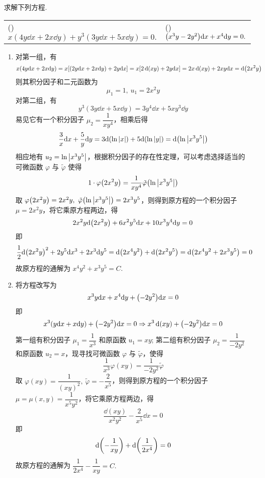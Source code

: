 \begin{example}
    求解下列方程.
    \setcounter{magicrownumbers}{0}
    \begin{table}[H]
        \centering
        \begin{tabular}{l | l}
            (\rownumber{}) $x(4y\dd x+2x\dd y)+y^3(3y\dd x+5x\dd y)=0.$ & (\rownumber{}) $\qty(x^3y-2y^2)\dd x+x^4\dd y=0.$ \\
        \end{tabular}
    \end{table}
\end{example}
\begin{solution}
    \begin{enumerate}[label=(\arabic{*})]
        \item 对第一组，有
              $$x(4y\dd x+2x\dd y)=x\qty[(2y\dd x+2x\dd y)+2y\dd x]=x\qty[2\dd (xy)+2y\dd x]=2x\dd (xy)+2xy\dd x=\dd \qty(2x^2y)$$
              则其积分因子和二元函数为 $$\mu_1=1,~u_1=2x^2y$$
              对第二组，有 $$y^3(3y\dd x+5x\dd y)=3y^4\dd x+5xy^3\dd y$$
              易见它有一个积分因子 $\mu_2=\dfrac{1}{xy^4}$，相乘后得 $$\dfrac{3}{x}\dd x+\dfrac{5}{y}\dd y=3\dd \qty(\ln|x|)+5\dd \qty(\ln|y|)=\dd \qty(\ln\qty|x^3y^5|)$$
              相应地有 $u_2=\ln\qty|x^3y^5|$，根据积分因子的存在性定理，可以考虑选择适当的可微函数 $\varphi$ 与 $\tilde{\varphi } $ 使得
              $$1\cdot\varphi\qty(2x^2y)=\dfrac{1}{xy^4}\tilde{\varphi } \qty(\ln\qty|x^3y^5|)$$
              取 $\varphi\qty(2x^2y)=2x^2y,~\tilde{\varphi } \qty(\ln\qty|x^3y^5|)=2x^3y^5$，则得到原方程的一个积分因子 $\mu=2x^2y$，将它乘原方程两边，得
              $$2x^2y\dd \qty(2x^2y)+6x^2y^5\dd x+10x^3y^4\dd y=0$$
              即 $$\dfrac{1}{2}\dd \qty(2x^2y)^2+2y^5\dd x^3+2x^3\dd y^5=\dd \qty(2x^4y^2)+\dd \qty(2x^2y^5)=\dd \qty(2x^4y^2+2x^3y^5)=0$$
              故原方程的通解为 $x^4y^2+x^3y^5=C.$
        \item 将方程改写为 $$x^3y\dd x+x^4\dd y+\qty(-2y^2)\dd x=0$$
              即 $$x^3\qty(y\dd x+x\dd y)+\qty(-2y^2)\dd x=0\Rightarrow x^3\dd (xy)+\qty(-2y^2)\dd x=0$$
              第一组有积分因子 $\mu_1=\dfrac{1}{x^3}$ 和原函数 $u_1=xy$; 第二组有积分因子 $\mu_2=\dfrac{1}{-2y^2}$ 和原函数 $u_2=x$，现寻找可微函数 $\varphi$ 与 $\tilde{\varphi } $，使得
              $$\dfrac{1}{x^3}\varphi(xy)=\dfrac{1}{-2y^2}\tilde{\varphi } $$
              取 $\varphi(xy)=\dfrac{1}{(xy)^2},~\tilde{\varphi } =-\dfrac{2}{x^5}$，则得到原方程的一个积分因子 $\mu=\mu(x,y)=\dfrac{1}{x^5y^2}$，将它乘原方程两边，得
              $$\dfrac{\dd (xy)}{x^2y^2}-\dfrac{2}{x^5}\dd x=0$$
              即 $$\dd \qty(-\dfrac{1}{xy})+\dd \qty(\dfrac{1}{2x^4})=0$$
              故原方程的通解为 $\dfrac{1}{2x^4}-\dfrac{1}{xy}=C.$
    \end{enumerate}
\end{solution}